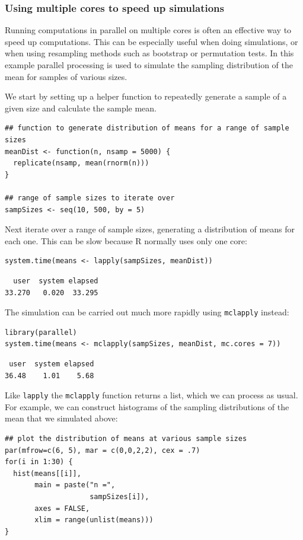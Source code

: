 \documentclass[11pt]{article}
\begin{document}
\subsubsection{Using multiple cores to speed up simulations}
\label{sec-6-3-1}
Running computations in parallel on multiple cores is often an effective way to speed up computations. This can be especially useful when doing simulations, or when using resampling methods such as bootstrap or permutation tests. In this example parallel processing is used to simulate the sampling distribution of the mean for samples of various sizes.

We start by setting up a helper function to repeatedly generate a sample of a given size and calculate the sample mean.
\begin{verbatim}
## function to generate distribution of means for a range of sample sizes
meanDist <- function(n, nsamp = 5000) {
  replicate(nsamp, mean(rnorm(n)))
}

## range of sample sizes to iterate over
sampSizes <- seq(10, 500, by = 5)
\end{verbatim}

Next iterate over a range of sample sizes, generating a distribution of means for each one. This can be slow because R normally uses only one core:
\begin{verbatim}
system.time(means <- lapply(sampSizes, meanDist))
\end{verbatim}

\begin{verbatim}
  user  system elapsed 
33.270   0.020  33.295
\end{verbatim}

The simulation can be carried out much more rapidly using \texttt{mclapply} instead:
\begin{verbatim}
library(parallel) 
system.time(means <- mclapply(sampSizes, meanDist, mc.cores = 7))
\end{verbatim}

\begin{verbatim}
 user  system elapsed 
36.48    1.01    5.68
\end{verbatim}

Like \texttt{lapply} the \texttt{mclapply} function returns a list, which we can process as usual. For example, we can construct histograms of the sampling distributions of the mean that we simulated above:
\begin{verbatim}
## plot the distribution of means at various sample sizes
par(mfrow=c(6, 5), mar = c(0,0,2,2), cex = .7)
for(i in 1:30) {
  hist(means[[i]], 
       main = paste("n =", 
                    sampSizes[i]), 
       axes = FALSE,
       xlim = range(unlist(means)))
}
\end{verbatim}
\end{document}
